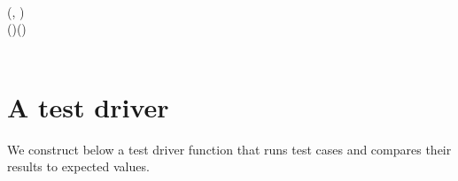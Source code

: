 \begin{hscode}
\\
\>[7]{}\<[10]%
\>[10]{}\;\;\<[23]%
\>[23]{}\mathrel{=}{}\<[23E]%
\>[26]{}\;\;(\llparenthesis \langle {}\rangle , \langle {}\rangle \rrparenthesis )\;\;\<[E]%
\\
\>[26]{}\;(\;){}\<[45]%
\>[45]{}\to {}\;\;(\;){}\<[E]%
\\
\>[26]{}\;\<[45]%
\>[45]{}\to {}\;\<[E]%
\\
\>[26]{}\<[45]%
\>[45]{}\to {}\<[E]%
\ColumnHook
\end{hscode}\resethooks

\section{A test driver}

We construct below a test driver function that runs test cases and compares
their results to expected values.

